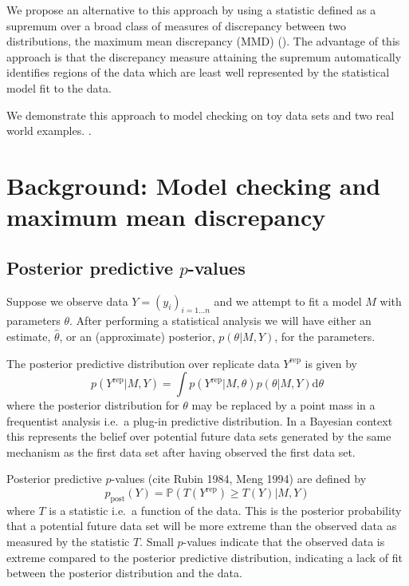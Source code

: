 \documentclass{article} %
\def\ie{i.e.\ }
\begin{document}
We propose an alternative to this approach by using a statistic defined as a supremum over a broad class of measures of discrepancy between two distributions, the maximum mean discrepancy (MMD)  ().
The advantage of this approach is that the discrepancy measure attaining the supremum automatically identifies regions of the data which are least well represented by the statistical model fit to the data.

We demonstrate this approach to model checking on toy data sets and two real world examples.
.

\section{Background: Model checking and maximum mean discrepancy}

\subsection{Posterior predictive $p$-values}

Suppose we observe data $Y = (y_i)_{i=1\ldots n}$ and we attempt to fit a model $M$ with parameters $\theta$.
After performing a statistical analysis we will have either an estimate, $\hat\theta$, or an (approximate) posterior, $p(\theta|M,Y)$, for the parameters.

The posterior predictive distribution over replicate data $Y^\textrm{rep}$ is given by
\begin{equation}
p(Y^\textrm{rep}|M,Y) = \int p(Y^\textrm{rep}|M,\theta)p(\theta|M,Y)\mathrm{d}\theta
\end{equation}
where the posterior distribution for $\theta$ may be replaced by a point mass in a frequentist analysis \ie a plug-in predictive distribution.
In a Bayesian context this represents the belief over potential future data sets generated by the same mechanism as the first data set after having observed the first data set.

Posterior predictive $p$-values (cite Rubin 1984, Meng 1994) are defined by
\begin{equation}
p_\textrm{post}(Y) = \mathbb{P}(T(Y^\textrm{rep})\geq T(Y)|M,Y)
\end{equation}
where $T$ is a statistic \ie a function of the data.
This is the posterior probability that a potential future data set will be more extreme than the observed data as measured by the statistic $T$.
Small $p$-values indicate that the observed data is extreme compared to the posterior predictive distribution, indicating a lack of fit between the posterior distribution and the data.
\end{document}
